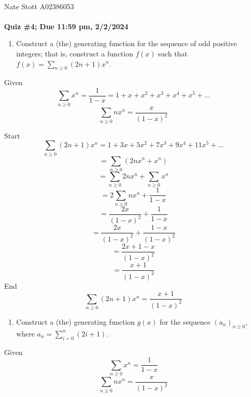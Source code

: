 \documentclass[10pt, AMS Euler]{article}
\newcommand{\ds}{\displaystyle}
\begin{document}
	
	\\

        Nate Stott A02386053 \\
	
	\noindent \underline{\hspace{2in}}\\
	
	{\bf Quiz \#4; Due 11:59 pm, 2/2/2024}\\

        \newpage
	\begin{enumerate}
		\item Construct a (the) generating function for the sequence of odd positive integers; that is, construct a function $f(x)$ such that $f(x) = \sum_{n \geq 0}(2n+1)x^n$.
        \end{enumerate}
        Given 
            $$ \sum_{n \geq 0} x^n = \frac{1}{1-x} = 1 + x + x^2 + x^3 + x^4 + x^5 + ... $$
            $$ \sum_{n \geq 0} n x^n = \frac{x}{(1-x)^2}$$

        Start
        $$\sum_{n \geq 0}(2n+1)x^n = 1 + 3x + 5x^2 + 7x^3 + 9x^4 + 11x^5 + ... $$
        $$ = \sum_{n \geq 0}(2nx^n+x^n) $$
        $$ = \sum_{n \geq 0} 2nx^n + \sum_{n \geq 0} x^n $$
        $$ = 2 \sum_{n \geq 0} nx^n + \frac{1}{1-x} $$
        $$ = \frac{2x}{(1-x)^2} + \frac{1}{1-x} $$
        $$ = \frac{2x}{(1-x)^2} + \frac{1-x}{(1-x)^2} $$
        $$ = \frac{2x+1-x}{(1-x)^2} $$
        $$ = \frac{x+1}{(1-x)^2} $$
        End
        $$ \sum_{n \geq 0}(2n+1)x^n = \frac{x+1}{(1-x)^2} $$

        \newpage
	\begin{enumerate}[resume]
		\item Construct a (the) generating function $g(x)$ for the sequence $(a_n)_{n \geq 0}$, where $a_n = \ds \sum_{i = 0}^n(2i+1)$. 
        \end{enumerate}

        Given 
        $$ \sum_{n \geq 0} x^n = \frac{1}{1-x} $$
        $$ \sum_{n \geq 0} n x^n = \frac{x}{(1-x)^2} $$
\end{document}

